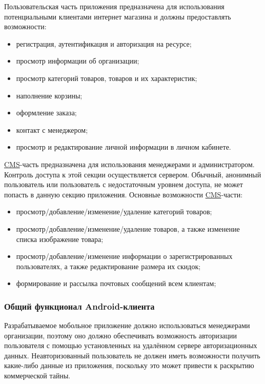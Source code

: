 Пользовательская часть приложения предназначена для использования потенциальными клиентами интернет магазина и должны предоставлять возможности:

\begin{itemize}
    \item регистрация, аутентификация и авторизация на ресурсе;
    \item просмотр информации об организации;
    \item просмотр категорий товаров, товаров и их характеристик;
    \item наполнение корзины;
    \item оформление заказа;
    \item контакт с менеджером;
    \item просмотр и редактирование личной информации в личном кабинете.
\end{itemize}

\hyperlink{gloss:cms}{CMS}-часть предназначена для использования менеджерами и администратором.
Контроль доступа к этой секции осуществляется сервером.
Обычный, анонимный пользователь или пользователь с недостаточным уровнем доступа, не может попасть в данную секцию приложения.
Основные возможности \hyperlink{gloss:cms}{CMS}-части:

\begin{itemize}
    \item просмотр/добавление/изменение/удаление категорий товаров;
    \item просмотр/добавление/изменение/удаление товаров, а также изменение списка изображение товара;
    \item просмотр/добавление/изменение информации о зарегистрированных пользователях, а также редактирование размера их скидок;
    \item формирование и рассылка почтовых сообщений всем клиентам;
\end{itemize}

\subsubsection{Общий функционал Android-клиента}\indent

Разрабатываемое мобольное приложение должно использоваться менеджерами организации, поэтому оно должно обеспечивать возможность авторизации пользователя с помощью установленных на удалённом сервере авторизационных данных. Неавторизованный пользователь не должен иметь возможности получить какие-либо данные из приложения, поскольку это может привести к раскрытию коммерческой тайны.

